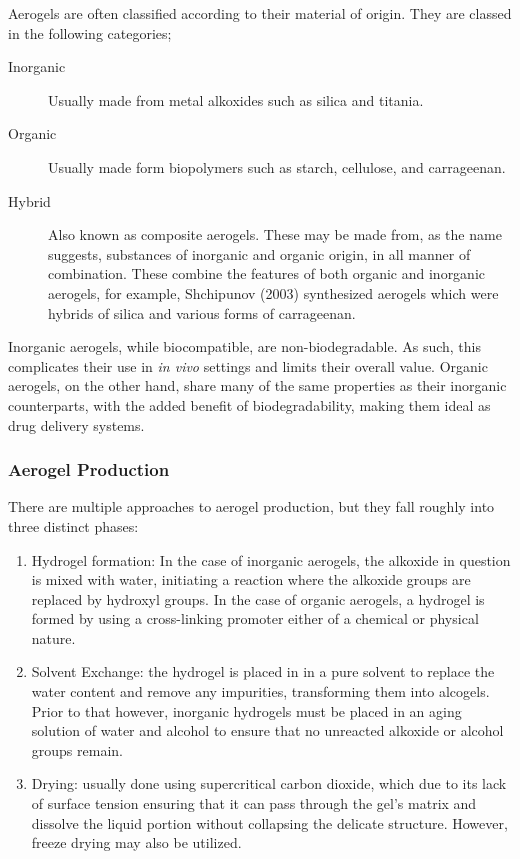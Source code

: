 \documentclass[a4paper,12pt]{article}
\begin{document}
Aerogels are often classified according to their material of origin. They are classed in the following categories\supercite{stergar_review_2016};

\begin{description}
	\item [Inorganic] Usually made from metal alkoxides such as silica and titania.
	\item [Organic] Usually made form biopolymers such as starch, cellulose, and carrageenan.
	\item [Hybrid] Also known as composite aerogels. These may be made from, as the name suggests, substances of inorganic and organic origin, in all manner of combination. These combine the features of both organic and inorganic aerogels, for example, Shchipunov (2003) synthesized aerogels which were hybrids of silica and various forms of carrageenan.\supercite{shchipunov_solgel-derived_2003}

\end{description}

Inorganic aerogels, while biocompatible, are non-biodegradable. As such, this complicates
their use in \textit{in vivo} settings and limits their overall value. Organic aerogels, on the other hand, share many of the same properties as their inorganic counterparts, with the added benefit of biodegradability, making them ideal as drug delivery systems.\supercite{ulker_emerging_2014}

\subsubsection{Aerogel Production}

There are multiple approaches to aerogel production, but they fall roughly into three distinct phases\supercite{ulker_emerging_2014}:

\begin{enumerate}
	\item Hydrogel formation: In the case of inorganic aerogels, the alkoxide in question is mixed with water, initiating a reaction where the alkoxide groups are replaced by hydroxyl groups. In the case of organic aerogels, a hydrogel is formed by using a cross-linking promoter either of a chemical or physical nature.
	\item Solvent Exchange: the hydrogel is placed in in a pure solvent to replace the water content and remove any impurities, transforming them into alcogels. Prior to that however, inorganic hydrogels must be placed in an aging solution of water and alcohol to ensure that no unreacted alkoxide or alcohol groups remain.
	\item Drying: usually done using supercritical carbon dioxide, which due to its lack of surface tension ensuring that it can pass through the gel’s matrix and dissolve the liquid portion without collapsing the delicate structure. However, freeze drying may also be utilized.
\end{enumerate} 
\end{document}
